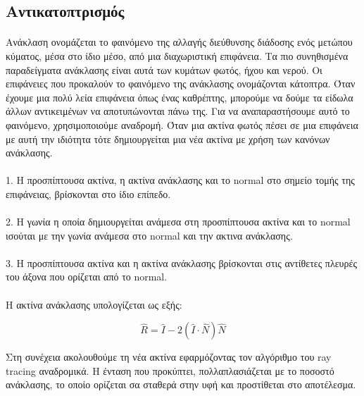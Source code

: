 \begin{sloppypar}
\subsection{Αντικατοπτρισμός}
\paragraph{}
	Ανάκλαση ονομάζεται το φαινόμενο της αλλαγής διεύθυνσης διάδοσης ενός μετώπου κύματος, μέσα στο ίδιο μέσο, 
από μια διαχωριστική επιφάνεια. Τα πιο συνηθισμένα παραδείγματα ανάκλασης είναι αυτά των κυμάτων φωτός, ήχου και νερού.
Οι επιφάνειες που προκαλούν το φαινόμενο της ανάκλασης ονομάζονται κάτοπτρα. Όταν έχουμε μια πολύ λεία επιφάνεια 
όπως ένας καθρέπτης, μπορούμε να δούμε τα είδωλα άλλων αντικειμένων να αποτυπώνονται πάνω της. Για να αναπαραστήσουμε 
αυτό το φαινόμενο, χρησιμοποιούμε αναδρομή. Όταν μια ακτίνα φωτός πέσει σε μια επιφάνεια με αυτή την ιδιότητα τότε 
δημιουργείται μια νέα ακτίνα με χρήση των κανόνων ανάκλασης.
\paragraph{}
1. H προσπίπτουσα ακτίνα, η ακτίνα ανάκλασης και το normal στο σημείο τομής της επιφάνειας, βρίσκονται στο ίδιο επίπεδο.
\paragraph{}
2. Η γωνία η οποία δημιουργείται ανάμεσα στη προσπίπτουσα ακτίνα και το normal ισούται με την γωνία ανάμεσα στο normal
και την ακτινα ανάκλασης.
\paragraph{}
3. Η προσπίπτουσα ακτίνα και η ακτίνα ανάκλασης βρίσκονται στις αντίθετες πλευρές του άξονα που ορίζεται από το normal.

\paragraph{}
H ακτίνα ανάκλασης υπολογίζεται ως εξής:

\begin{equation}
\hat{R} = \hat{I} - 2 ( \hat{I} \cdot \hat{N} ) \hat{N}
\end{equation}

Στη συνέχεια ακολουθούμε τη νέα ακτίνα εφαρμόζοντας τον αλγόριθμο του ray tracing αναδρομικά. Η ένταση που προκύπτει, 
πολλαπλασιάζεται με το ποσοστό ανάκλασης, το οποίο ορίζεται σα σταθερά στην υφή και προστίθεται στο αποτέλεσμα.


\end{sloppypar}
